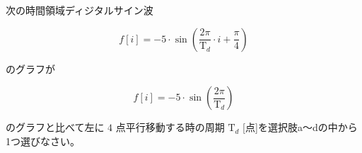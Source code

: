 次の時間領域ディジタルサイン波 

\[
f[i] = -5 \cdot \sin \left ( \frac{2 \pi}{\textrm{T}_d}  \cdot i + \frac{\pi}{4} \right )
\]

\noindent のグラフが

\[
f[i] = -5 \cdot \sin \left ( \frac{2 \pi}{\textrm{T}_d} \right )
\]

\noindent のグラフと比べて左に $4$ 点平行移動する時の周期 $\textrm{T}_d$ [点]を選択肢a〜dの中から1つ選びなさい。
